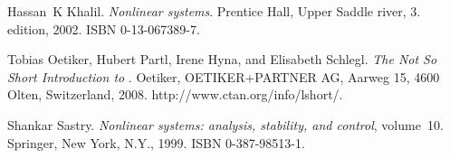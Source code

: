 \documentclass[a4paper,12pt,oneside,onecolumn]{article} %
\begin{document}

\begin{thebibliography}{99}
Hassan~K Khalil.
\newblock \emph{Nonlinear systems}.
\newblock Prentice Hall, Upper Saddle river, 3. edition, 2002.
\newblock ISBN 0-13-067389-7.

Tobias Oetiker, Hubert Partl, Irene Hyna, and Elisabeth Schlegl.
\newblock \emph{The Not So Short Introduction to \LaTeXe}.
\newblock Oetiker, OETIKER+PARTNER AG, Aarweg 15, 4600 Olten, Switzerland,
  2008.
\newblock http://www.ctan.org/info/lshort/.

Shankar Sastry.
\newblock \emph{Nonlinear systems: analysis, stability, and control},
  volume~10.
\newblock Springer, New York, N.Y., 1999.
\newblock ISBN 0-387-98513-1.
\end{thebibliography}
\end{document}
